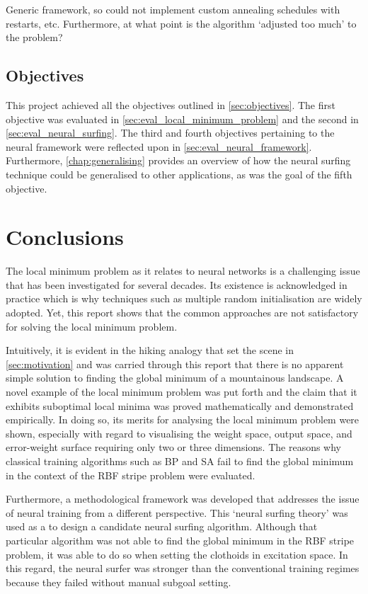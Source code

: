 Generic framework, so could not implement custom annealing schedules with restarts, etc.
Furthermore, at what point is the algorithm `adjusted too much' to the problem?

\section{Objectives}
This project achieved all the objectives outlined in \ref{sec:objectives}. 
The first objective was evaluated in \ref{sec:eval_local_minimum_problem} and the second in \ref{sec:eval_neural_surfing}.
The third and fourth objectives pertaining to the neural framework were reflected upon in \ref{sec:eval_neural_framework}.
Furthermore, \ref{chap:generalising} provides an overview of how the neural surfing technique could be generalised to other applications, as was the goal of the fifth objective.

\chapter{Conclusions}
The local minimum problem as it relates to neural networks is a challenging issue that has been investigated for several decades.
Its existence is acknowledged in practice which is why techniques such as multiple random initialisation are widely adopted.
Yet, this report shows that the common approaches are not satisfactory for solving the local minimum problem.

Intuitively, it is evident in the hiking analogy that set the scene in \ref{sec:motivation} and was carried through this report that there is no apparent simple solution to finding the global minimum of a mountainous landscape.
A novel example of the local minimum problem was put forth and the claim that it exhibits suboptimal local minima was proved mathematically and demonstrated empirically.
In doing so, its merits for analysing the local minimum problem were shown, especially with regard to visualising the weight space, output space, and error-weight surface requiring only two or three dimensions.
The reasons why classical training algorithms such as BP and SA fail to find the global minimum in the context of the RBF stripe problem were evaluated.

Furthermore, a methodological framework was developed that addresses the issue of neural training from a different perspective.
This `neural surfing theory' was used as a to design a candidate neural surfing algorithm.
Although that particular algorithm was not able to find the global minimum in the RBF stripe problem, it was able to do so when setting the clothoids in excitation space.
In this regard, the neural surfer was stronger than the conventional training regimes because they failed without manual subgoal setting.

